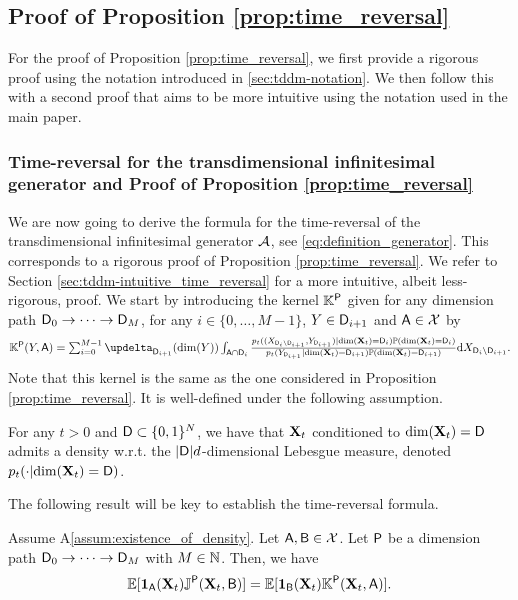 \subsection{Proof of Proposition \ref{prop:time_reversal}}
For the proof of Proposition \ref{prop:time_reversal}, we first provide a rigorous proof using the notation introduced in \ref{sec:tddm-notation}. We then follow this with a second proof that aims to be more intuitive using the notation used in the main paper.

\subsubsection{Time-reversal for the transdimensional infinitesimal generator and Proof of Proposition \ref{prop:time_reversal}}
\label{sec:tddm-rigorousProofTimeReversal}

We are now going to derive the formula for the time-reversal of the
transdimensional infinitesimal generator $\mathcal{A}$, see
\eqref{eq:definition_generator}. This corresponds to a rigorous proof of
Proposition \ref{prop:time_reversal}. We refer to Section
\ref{sec:tddm-intuitive_time_reversal} for a more intuitive, albeit less-rigorous,
proof. We start by introducing the kernel $\mathbb{K}^{\mathsf{P}}$ given for any dimension
path $\mathsf{D}_0 \to \dots \to \mathsf{D}_M$, for any $i \in \{0, \dots, M-1\}$,
$Y \in \mathsf{D}_{i+1}$ and $\mathsf{A} \in \mathcal{X}$ by
\begin{equation}
  \textstyle \Kbb^\msp(Y, \msa) = \sum_{i=0}^{M-1} \updelta_{\msd_{i+1}}(\dim(Y)) \int_{\msa \cap \msd_i} \tfrac{p_t((X_{\msd_i \backslash \msd_{i+1}}, Y_{\msd_{i+1}})|\dim(\bfX_t)=\msd_i)\Pbb(\dim(\bfX_t)=\msd_i)}{p_t(Y_{\msd_{i+1}}|\dim(\bfX_t)=\msd_{i+1})\Pbb(\dim(\bfX_t)=\msd_{i+1})} \rmd X_{\msd_i \backslash \msd_{i+1}} . 
\end{equation}
Note that this kernel is the same as the one considered in Proposition
\ref{prop:time_reversal}. It is well-defined under the following assumption.

\begin{assumption}
  \label{assum:existence_of_density}
  For any $t > 0$ and $\mathsf{D} \subset \{0,1\}^N$, we have that $\mathbf{X}_t$
  conditioned to $\mathrm{dim}(\mathbf{X}_t) = \mathsf{D}$ admits a density w.r.t. the
  $|\mathsf{D}|d$-dimensional Lebesgue measure, denoted
  $p_t(\cdot | \mathrm{dim}(\mathbf{X}_t) = \mathsf{D})$. 
\end{assumption}

The following result will be key to establish the time-reversal formula.

\begin{lemma}
  \label{lemma:flux_equation}
  Assume \textup{A\ref{assum:existence_of_density}}. Let $\mathsf{A}, \mathsf{B} \in \mathcal{X}$. Let
  $\mathsf{P}$ be a dimension path $\mathsf{D}_0 \to \dots \to \mathsf{D}_M$ with $M \in \mathbb{N}$.
  Then, we have
  \begin{equation}
    \mathbb{E}[\mathbf{1}_{\mathsf{A}}(\mathbf{X}_t) \mathbb{J}^{\mathsf{P}}(\mathbf{X}_t, \mathsf{B})] = \mathbb{E}[\mathbf{1}_{\mathsf{B}}(\mathbf{X}_t) \mathbb{K}^{\mathsf{P}}(\mathbf{X}_t, \mathsf{A})] . 
  \end{equation}
\end{lemma}

